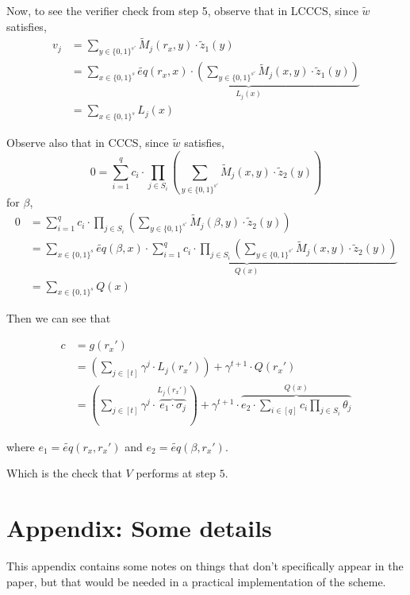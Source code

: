 \documentclass{article}
\theoremstyle{definition}
\begin{document}
Now, to see the verifier check from step 5, observe that in LCCCS, since $\widetilde{w}$ satisfies,
\begin{align*}
	v_j &= \sum_{y \in \{0,1\}^{s'}} \widetilde{M}_j(r_x, y) \cdot \widetilde{z}_1(y)\\
	    &= \sum_{x \in \{0,1\}^s}
		\underbrace{
			\widetilde{eq}(r_x, x) \cdot \left( \sum_{y \in \{0,1\}^{s'}} \widetilde{M}_j(x, y) \cdot \widetilde{z}_1(y) \right)
		}_{L_j(x)}\\
	    &= \sum_{x \in \{0,1\}^s} L_j(x)
\end{align*}

Observe also that in CCCS, since $\widetilde{w}$ satisfies,
$$
0=\sum_{i=1}^q c_i \cdot \prod_{j \in S_i} \left( \sum_{y \in \{0, 1\}^{s'}} \widetilde{M}_j(x, y) \cdot \widetilde{z}_2(y) \right)
$$
for $\beta$,
\begin{align*}
	0&=\sum_{i=1}^q c_i \cdot \prod_{j \in S_i} \left( \sum_{y \in \{0, 1\}^{s'}} \widetilde{M}_j(\beta, y) \cdot \widetilde{z}_2(y) \right)\\
	 &= \sum_{x \in \{0,1\}^s}
	 \underbrace{\widetilde{eq}(\beta , x) \cdot
		\sum_{i=1}^q c_i \cdot \prod_{j \in S_i} \left( \sum_{y \in \{0, 1\}^{s'}} \widetilde{M}_j(x, y) \cdot \widetilde{z}_2(y) \right)
	}_{Q(x)}\\
	 &= \sum_{x \in \{0,1\}^s} Q(x)
\end{align*}

Then we can see that

\begin{align*}
	c &= g(r_x')\\
	  &= \left( \sum_{j \in [t]} \gamma^j \cdot L_j(r_x') \right) + \gamma^{t+1} \cdot Q(r_x')\\
	  &= \left( \sum_{j \in [t]} \gamma^j \cdot \overbrace{e_1 \cdot \sigma_j}^{L_j(r_x')} \right) + \gamma^{t+1} \cdot \overbrace{e_2 \cdot \sum_{i \in [q]} c_i \prod_{j \in S_i} \theta_j}^{Q(x)}
\end{align*}

where $e_1 = \widetilde{eq}(r_x, r_x')$ and $e_2=\widetilde{eq}(\beta, r_x')$.

Which is the check that $V$ performs at step $5$.



\appendix
\section{Appendix: Some details}
This appendix contains some notes on things that don't specifically appear in the paper, but that would be needed in a practical implementation of the scheme.
\end{document}
